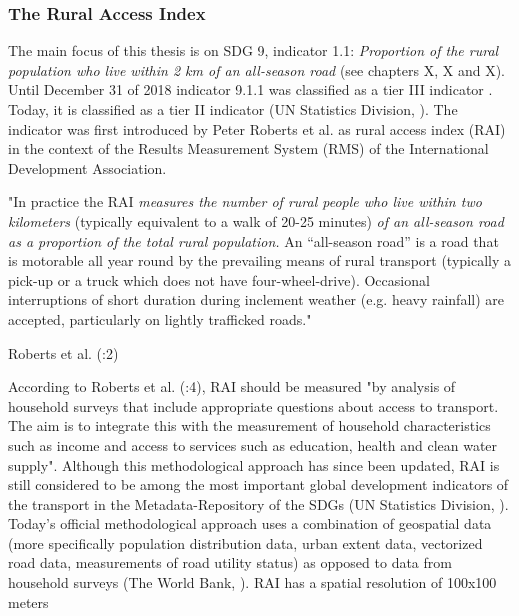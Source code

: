 	            \medskip
	            
	            
	            

	       \subsubsection{The Rural Access Index}
	            
	            The main focus of this thesis is on SDG 9, indicator 1.1: \textit{Proportion of the rural population who live within 2 km of an all-season road} (see chapters X, X and X). Until December 31 of 2018 indicator 9.1.1 was classified as a tier III indicator \citep{sdsn2015}. Today, it is classified as a tier II indicator (UN Statistics Division, \citeyear{unitednationsstatisticsdivision2019b}). The indicator was first introduced by Peter Roberts et al. \citeyear{roberts2006} as rural access index (RAI) in the context of the Results Measurement System (RMS) of the International Development Association. 
	            
	            \medskip
	            
	             \begin{tcolorbox}
    				
    				"In practice the RAI \textit{measures the number of rural people who live within two kilometers} (typically equivalent to a walk of 20-25 minutes) \textit{of an all-season road as a proportion of the total rural population.} An “all-season road” is a road that is motorable all year round by the prevailing means of rural transport (typically a pick-up or a truck which does not have four-wheel-drive). Occasional interruptions of short duration during inclement weather (e.g. heavy rainfall) are accepted, particularly on lightly trafficked roads."
    				
    				\begin{center}
    				    Roberts et al. (\citeyear{roberts2006}:2)
    				\end{center}
			    \end{tcolorbox}

	            \medskip
                
                According to Roberts et al. (\citeyear{roberts2006}:4), RAI should be measured "by analysis of household surveys that include appropriate questions about access to transport. The aim is to integrate this with the measurement of household characteristics such as income and access to services such as education, health and clean water supply". Although this methodological approach has since been updated, RAI is still considered to be among the most important global development indicators of the transport in the Metadata-Repository of the SDGs (UN Statistics Division, \citeyear{unitednationsstatisticsdivision2019a}). Today's official methodological approach uses a combination of geospatial data (more specifically population distribution data, urban extent data, vectorized road data, measurements of road utility status) as opposed to data from household surveys (The World Bank, \citeyear{theworldbank2016}). RAI has a spatial resolution of 100x100 meters
                
